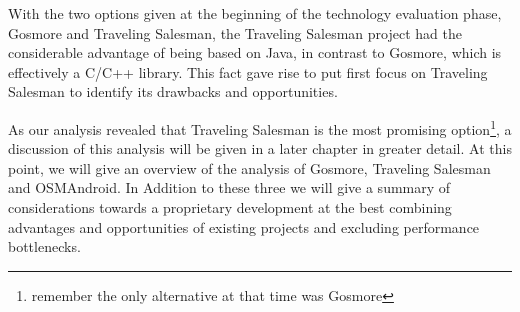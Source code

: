 With the two options given at the beginning of the technology evaluation phase, Gosmore and Traveling Salesman, the Traveling Salesman project had the considerable advantage of being based on Java, in contrast to Gosmore, which is effectively a C/C++ library. This fact gave rise to put first focus on Traveling Salesman to identify its drawbacks and opportunities.\newline

As our analysis revealed that Traveling Salesman is the most promising option\footnote{remember the only alternative at that time was Gosmore}, a discussion of this analysis will be given in a later chapter in greater detail. At this point, we will give an overview of the analysis of Gosmore, Traveling Salesman and OSMAndroid. In Addition to these three we will give a summary of considerations towards a proprietary development at the best combining advantages and opportunities of existing projects and excluding performance bottlenecks.\newline

